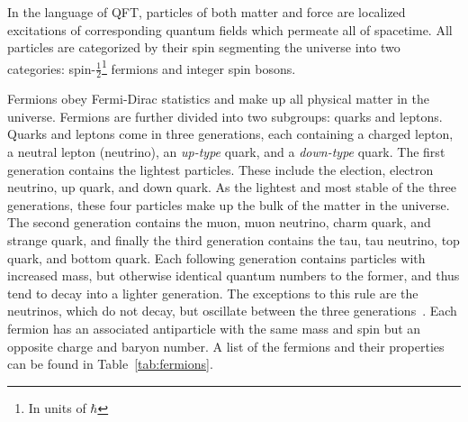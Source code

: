 In the language of QFT, particles of both matter and force are localized excitations of corresponding quantum fields which permeate all of spacetime.
All particles are categorized by their spin segmenting the universe into two categories: spin-$\frac{1}{2}$\footnote{In units of $\hbar$} fermions and integer spin bosons.

Fermions obey Fermi-Dirac statistics and make up all physical matter in the universe.
Fermions are further divided into two subgroups: quarks and leptons.
Quarks and leptons come in three generations, each containing a charged lepton, a neutral lepton (neutrino), an \textit{up-type} quark, and a \textit{down-type} quark.
The first generation contains the lightest particles.
These include the election, electron neutrino, up quark, and down quark.
As the lightest and most stable of the three generations, these four particles make up the bulk of the matter in the universe.
The second generation contains the muon, muon neutrino, charm quark, and strange quark, and finally the third generation contains the tau, tau neutrino, top quark, and bottom quark.
Each following generation contains particles with increased mass, but otherwise identical quantum numbers to the former, and thus tend to decay into a lighter generation.
The exceptions to this rule are the neutrinos, which do not decay, but oscillate between the three generations~\cite{fukuda1998}.
Each fermion has an associated antiparticle with the same mass and spin but an opposite charge and baryon number.
A list of the fermions and their properties can be found in Table~\ref{tab:fermions}.

